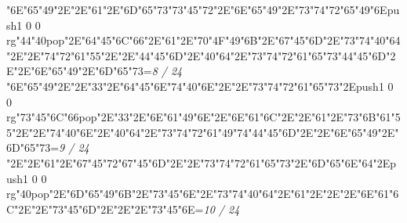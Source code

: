 \null\vfill\ipa\char"6E\ipa\char"65\ipa\char"49\ipa\char"2E\quad\quad\quad\quad\ipa\char"2E\ipa\char"61\ipa\char"2E\ipa\char"6D\ipa\char"65\ipa\char"73\bigskip\ipa\char"73\ipa\char"45\ipa\char"72\ipa\char"2E\ipa\char"6E\ipa\char"65\ipa\char"49\ipa\char"2E\ipa\char"73\ipa\char"74\ipa\char"72\ipa\char"65\ipa\char"49\ipa\char"6E\bigskip\pdfcolorstack\match push{1 0 0 rg}\ipa\char"44\ipa\char"40\pdfcolorstack\match pop{}\ipa\char"2E\ipa\char"64\ipa\char"45\ipa\char"6C\ipa\char"66\ipa\char"2E\ipa\char"61\ipa\char"2E\ipa\char"70\ipa\char"4F\ipa\char"49\ipa\char"6B\ipa\char"2E\ipa\char"67\ipa\char"45\ipa\char"6D\ipa\char"2E\ipa\char"73\ipa\char"74\ipa\char"40\ipa\char"64\ipa\char"2E\quad\quad\quad\bigskip\quad\ipa\char"2E\ipa\char"74\ipa\char"72\ipa\char"61\ipa\char"55\ipa\char"2E\quad\quad\ipa\char"2E\ipa\char"44\ipa\char"45\ipa\char"6D\ipa\char"2E\ipa\char"40\ipa\char"64\ipa\char"2E\ipa\char"73\ipa\char"74\ipa\char"72\ipa\char"61\ipa\char"65\ipa\char"73\bigskip\ipa\char"44\ipa\char"45\ipa\char"6D\ipa\char"2E\quad\quad\ipa\char"2E\ipa\char"6E\ipa\char"65\ipa\char"49\ipa\char"2E\ipa\char"6D\ipa\char"65\ipa\char"73\bigskip\vfill\footline={\hfill\tenrm\it 8 / 24}\eject
\null\vfill\ipa\char"6E\ipa\char"65\ipa\char"49\ipa\char"2E\quad\quad\quad\quad\ipa\char"2E\ipa\char"33\ipa\char"2E\ipa\char"64\ipa\char"45\ipa\char"6E\bigskip\ipa\char"74\ipa\char"40\ipa\char"6E\ipa\char"2E\quad\quad\quad\ipa\char"2E\ipa\char"73\ipa\char"74\ipa\char"72\ipa\char"61\ipa\char"65\ipa\char"73\bigskip\quad\quad\ipa\char"2E\pdfcolorstack\match push{1 0 0 rg}\ipa\char"73\ipa\char"45\ipa\char"6C\ipa\char"66\pdfcolorstack\match pop{}\ipa\char"2E\ipa\char"33\ipa\char"2E\ipa\char"6E\ipa\char"61\ipa\char"49\ipa\char"6E\ipa\char"2E\ipa\char"6E\ipa\char"61\ipa\char"6C\ipa\char"2E\quad\quad\quad\quad\ipa\char"2E\quad\quad\quad\bigskip\ipa\char"61\ipa\char"2E\ipa\char"73\ipa\char"6B\ipa\char"61\ipa\char"55\ipa\char"2E\quad\quad\ipa\char"2E\ipa\char"74\ipa\char"40\ipa\char"6E\ipa\char"2E\ipa\char"40\ipa\char"64\ipa\char"2E\ipa\char"73\ipa\char"74\ipa\char"72\ipa\char"61\ipa\char"49\ipa\char"74\bigskip\ipa\char"44\ipa\char"45\ipa\char"6D\ipa\char"2E\quad\quad\ipa\char"2E\ipa\char"6E\ipa\char"65\ipa\char"49\ipa\char"2E\ipa\char"6D\ipa\char"65\ipa\char"73\bigskip\vfill\footline={\hfill\tenrm\it 9 / 24}\eject
\null\vfill\quad\quad\quad\ipa\char"2E\quad\quad\quad\quad\ipa\char"2E\ipa\char"61\ipa\char"2E\ipa\char"67\ipa\char"45\ipa\char"72\bigskip\ipa\char"67\ipa\char"45\ipa\char"6D\ipa\char"2E\quad\quad\quad\ipa\char"2E\ipa\char"73\ipa\char"74\ipa\char"72\ipa\char"61\ipa\char"65\ipa\char"73\bigskip\quad\quad\ipa\char"2E\ipa\char"6D\ipa\char"65\ipa\char"6E\ipa\char"64\ipa\char"2E\pdfcolorstack\match push{1 0 0 rg}\ipa\char"40\pdfcolorstack\match pop{}\ipa\char"2E\ipa\char"6D\ipa\char"65\ipa\char"49\ipa\char"6B\ipa\char"2E\ipa\char"73\ipa\char"45\ipa\char"6E\ipa\char"2E\ipa\char"73\ipa\char"74\ipa\char"40\ipa\char"64\ipa\char"2E\quad\quad\quad\bigskip\ipa\char"61\ipa\char"2E\quad\quad\quad\quad\ipa\char"2E\quad\quad\ipa\char"2E\ipa\char"6E\ipa\char"61\ipa\char"6C\ipa\char"2E\quad\quad\ipa\char"2E\quad\quad\quad\quad\quad\quad\bigskip\ipa\char"73\ipa\char"45\ipa\char"6D\ipa\char"2E\quad\quad\ipa\char"2E\quad\quad\quad\ipa\char"2E\ipa\char"73\ipa\char"45\ipa\char"6E\bigskip\vfill\footline={\hfill\tenrm\it 10 / 24}\eject
